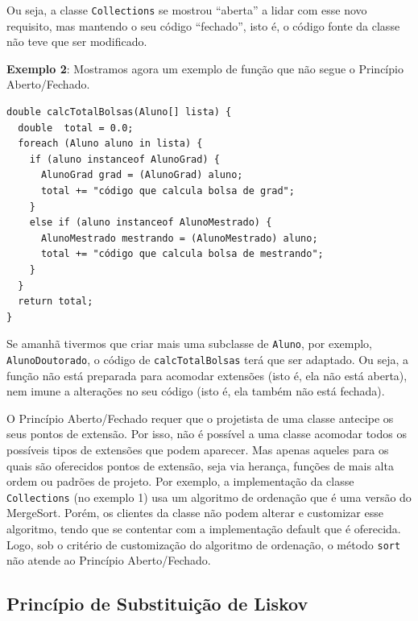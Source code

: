 \documentclass[
  11pt,
  twoside]{book}
\newcommand{\passthrough}[1]{#1}
\begin{document}
Ou seja, a classe \passthrough{\lstinline!Collections!} se mostrou
``aberta'' a lidar com esse novo requisito, mas mantendo o seu código
``fechado'', isto é, o código fonte da classe não teve que ser
modificado.

\textbf{Exemplo 2}: Mostramos agora um exemplo de função que não segue o
Princípio Aberto/Fechado.

\begin{lstlisting}
double calcTotalBolsas(Aluno[] lista) {
  double  total = 0.0;
  foreach (Aluno aluno in lista) {
    if (aluno instanceof AlunoGrad) {
      AlunoGrad grad = (AlunoGrad) aluno;
      total += "código que calcula bolsa de grad";
    }
    else if (aluno instanceof AlunoMestrado) {
      AlunoMestrado mestrando = (AlunoMestrado) aluno;
      total += "código que calcula bolsa de mestrando";
    }
  }
  return total;
}
\end{lstlisting}

Se amanhã tivermos que criar mais uma subclasse de
\passthrough{\lstinline!Aluno!}, por exemplo,
\passthrough{\lstinline!AlunoDoutorado!}, o código de
\passthrough{\lstinline!calcTotalBolsas!} terá que ser adaptado. Ou
seja, a função não está preparada para acomodar extensões (isto é, ela
não está aberta), nem imune a alterações no seu código (isto é, ela
também não está fechada).

O Princípio Aberto/Fechado requer que o projetista de uma classe
antecipe os seus pontos de extensão. Por isso, não é possível a uma
classe acomodar todos os possíveis tipos de extensões que podem
aparecer. Mas apenas aqueles para os quais são oferecidos pontos de
extensão, seja via herança, funções de mais alta ordem ou padrões de
projeto. Por exemplo, a implementação da classe
\passthrough{\lstinline!Collections!} (no exemplo 1) usa um algoritmo de
ordenação que é uma versão do MergeSort. Porém, os clientes da classe
não podem alterar e customizar esse algoritmo, tendo que se contentar
com a implementação default que é oferecida. Logo, sob o critério de
customização do algoritmo de ordenação, o método
\passthrough{\lstinline!sort!} não atende ao Princípio Aberto/Fechado.

\hypertarget{princuxedpio-de-substituiuxe7uxe3o-de-liskov}{%
\subsection{Princípio de Substituição de
Liskov}\label{princuxedpio-de-substituiuxe7uxe3o-de-liskov}}

\end{document}
